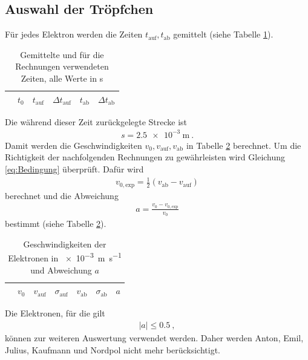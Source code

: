 \subsection{Auswahl der Tröpfchen}
Für jedes Elektron werden die Zeiten $t_\text{auf},t_\text{ab}$ gemittelt (siehe Tabelle \ref{fig:Zeiten}).
\begin{table}[h!]
	\centering
	\begin{tabular}{cccccc}
		& $t_0$ & $t_\text{auf}$ & $\Delta t_\text{auf}$ & $t_\text{ab}$ & $\Delta t_\text{ab}$ \\
		\hline
		
	\end{tabular}
	\caption{Gemittelte und für die Rechnungen verwendeten Zeiten, alle Werte in \si{\second}}
	\label{fig:Zeiten}
\end{table}
Die während dieser Zeit zurückgelegte Strecke ist
\begin{align}
	s = \SI{2.5e-3}{\meter} \ .
\end{align}
Damit werden die Geschwindigkeiten $v_0,v_\text{auf},v_\text{ab}$ in Tabelle \ref{fig:Vel} berechnet. Um die Richtigkeit der nachfolgenden Rechnungen zu gewährleisten wird Gleichung \eqref{eq:Bedingung} überprüft. Dafür wird
\begin{align}
	v_{0,\text{exp}} = \frac{1}{2}(v_\text{ab}-v_\text{auf})
\end{align}
berechnet und die Abweichung
\begin{align}
	a = \frac{v_0-v_{0,\text{exp}}}{v_0}
\end{align}
bestimmt (siehe Tabelle \ref{fig:Vel}).
\begin{table}[h!]
	\centering
\begin{tabular}{cccccc|c}
	& $v_0$ & $v_\text{auf}$ & $\sigma_\text{auf}$ & $v_\text{ab}$ & $\sigma_\text{ab}$ & $a$ \\
	\hline
	
\end{tabular}
\caption{Geschwindigkeiten der Elektronen in \SI{e-3}{\meter\per\second} und Abweichung $a$}
\label{fig:Vel}
\end{table}
Die Elektronen, für die gilt
\begin{align}
	|a|\leq 0.5 \ ,
\end{align}
können zur weiteren Auswertung verwendet werden. Daher werden Anton, Emil, Julius, Kaufmann und Nordpol nicht mehr berücksichtigt. \\
\ \\

